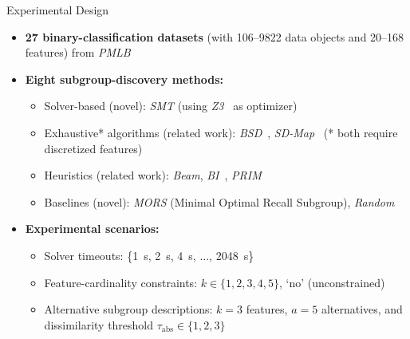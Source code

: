 \documentclass[en, navbaroff, handout]{sdqbeamer}
\begin{document}
\begin{frame}[t]{Experimental Design}
	\begin{itemize}
		\item \textbf{27 binary-classification datasets} (with 106--9822 data objects and 20--168 features) from \emph{PMLB}~\cite{olson2017pmlb, romano2021pmlb}
		\pause
		\vspace{\baselineskip}
		\item \textbf{Eight subgroup-discovery methods:}
		\begin{itemize}
			\item Solver-based (novel): \emph{SMT} (using \emph{Z3}~\cite{bjorner2015nuz, deMoura2008z3} as optimizer)
			\item Exhaustive* algorithms (related work): \emph{BSD}~\cite{lemmerich2010fast}, \emph{SD-Map}~\cite{atzmueller2006sd} (* both require discretized features)
			\item Heuristics (related work): \emph{Beam}, \emph{BI}~\cite{mampaey2012efficient}, \emph{PRIM}~\cite{friedman1999bump}
			\item Baselines (novel): \emph{MORS} (Minimal Optimal Recall Subgroup), \emph{Random}
		\end{itemize}
		\pause
		\vspace{\baselineskip}
		\item \textbf{Experimental scenarios:}
		\begin{itemize}
			\item Solver timeouts: \{1~s, 2~s, 4~s, $\dots$, 2048~s\}
			\item Feature-cardinality constraints: $k \in \{1, 2, 3, 4, 5\}$, `no' (unconstrained)
			\item Alternative subgroup descriptions: $k=3$ features, $a=5$ alternatives, and dissimilarity threshold $\tau_{\text{abs}} \in \{1, 2, 3\}$

\end{itemize}
\end{itemize}
\end{frame}
\end{document}
